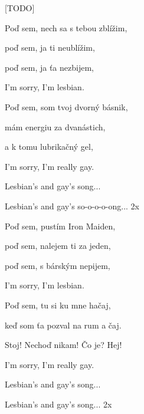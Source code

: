 \begin{song}


 \quad

\large


\Large

[TODO]

\bigskip

 Poď sem, nech sa s tebou zblížim, \par
{} poď sem, ja ti neublížim, \par
{} poď sem, ja ťa nezbijem, \par
{} I'm sorry, I'm lesbian. \par

\bigskip

Poď sem, som tvoj dvorný básnik, \par
{}mám energiu za dvanástich, \par
{}a k tomu lubrikačný gel, \par
{}I'm sorry, I'm really gay. \par

\bigskip

 Lesbian's and gay's  song...  \par
{} Lesbian's and gay's  so-o-o-o-ong...  2x \par

\bigskip

Poď sem, pustím Iron Maiden, \par
{}poď sem, nalejem ti za jeden, \par
{}poď sem, s bárským nepijem, \par
{}I'm sorry, I'm lesbian. \par

\bigskip

Poď sem, tu si ku mne hačaj, \par
{}keď som ťa pozval na rum a čaj. \par
{}Stoj! Nechoď nikam! Čo je? Hej! \par
{}I'm sorry, I'm really gay. \par

\bigskip

 Lesbian's and gay's  song...  \par
{} Lesbian's and gay's  song...  2x \par


\end{song}
